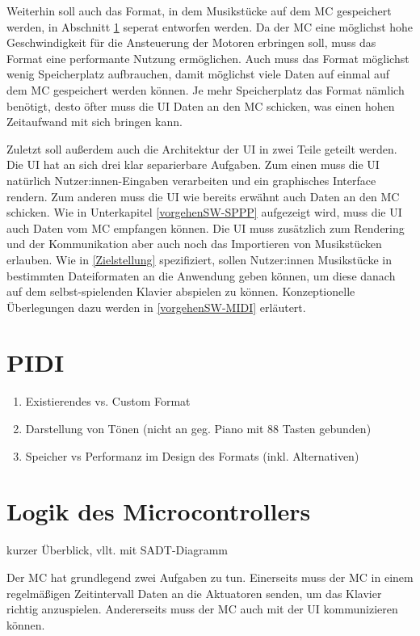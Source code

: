 Weiterhin soll auch das Format, in dem Musikstücke auf dem \ac{MC} gespeichert werden, in Abschnitt \ref{vorgehenSW-PIDI} seperat entworfen werden.
Da der \ac{MC} eine möglichst hohe Geschwindigkeit für die Ansteuerung der Motoren erbringen soll, muss das Format eine performante Nutzung ermöglichen.
Auch muss das Format möglichst wenig Speicherplatz aufbrauchen, damit möglichst viele Daten auf einmal auf dem \ac{MC} gespeichert werden können.
Je mehr Speicherplatz das Format nämlich benötigt, desto öfter muss die \ac{UI} Daten an den \ac{MC} schicken, was einen hohen Zeitaufwand mit sich bringen kann.

Zuletzt soll außerdem auch die Architektur der \ac{UI} in zwei Teile geteilt werden.
Die \ac{UI} hat an sich drei klar separierbare Aufgaben.
Zum einen muss die \ac{UI} natürlich Nutzer:innen-Eingaben verarbeiten und ein graphisches Interface rendern.
Zum anderen muss die \ac{UI} wie bereits erwähnt auch Daten an den \ac{MC} schicken.
Wie in Unterkapitel \ref{vorgehenSW-SPPP} aufgezeigt wird, muss die \ac{UI} auch Daten vom \ac{MC} empfangen können.
Die UI muss zusätzlich zum Rendering und der Kommunikation aber auch noch das Importieren von Musikstücken erlauben.
Wie in \ref{Zielstellung} spezifiziert, sollen Nutzer:innen Musikstücke in bestimmten Dateiformaten an die Anwendung geben können, um diese danach auf dem selbst-spielenden Klavier abspielen zu können.
Konzeptionelle Überlegungen dazu werden in \ref{vorgehenSW-MIDI} erläutert.


\section{PIDI} \label{vorgehenSW-PIDI}
\begin{enumerate}
	\item Existierendes vs. Custom Format
	\item Darstellung von Tönen (nicht an geg. Piano mit 88 Tasten gebunden)
	\item Speicher vs Performanz im Design des Formats (inkl. Alternativen)
\end{enumerate}

\section{Logik des Microcontrollers} \label{vorgehenSW-MC}
kurzer Überblick, vllt. mit SADT-Diagramm

Der \ac{MC} hat grundlegend zwei Aufgaben zu tun. Einerseits muss der \ac{MC} in einem regelmäßigen Zeitintervall Daten an die Aktuatoren senden, um das Klavier richtig anzuspielen. Andererseits muss der \ac{MC} auch mit der \ac{UI} kommunizieren können.

